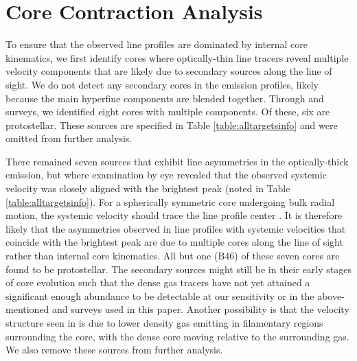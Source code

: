 \documentclass[iop,twocolappendix]{emulateapj}
\begin{document}
\section{Core Contraction Analysis}
\label{sec:analysis}

 To ensure that the observed {\HCO} line profiles are dominated by internal core kinematics, we first identify cores where optically-thin line tracers reveal multiple velocity components that are likely due to secondary sources along the line of sight. We do not detect any secondary cores in the {\NtD} emission profiles, likely because the main hyperfine components are blended together. Through {\NtH} \citep{Kirk2007} and {\ammonia} \citep{Rosolowsky2008} surveys, we identified eight cores with multiple components. Of these, six are protostellar. These sources are specified in Table \ref{table:alltargetsinfo} and were omitted from further analysis. 

There remained seven sources that exhibit line asymmetries in the optically-thick {\HCO} emission, but where examination by eye revealed that the observed systemic velocity was closely aligned with the brightest {\HCO} peak (noted in Table \ref{table:alltargetsinfo}). For a spherically symmetric core undergoing bulk radial motion, the systemic velocity should trace the line profile center \citep{DeVries2005}. It is therefore likely that the asymmetries observed in line profiles with systemic velocities that coincide with the brightest {\HCO} peak are due to multiple cores along the line of sight rather than internal core kinematics. All but one (B46) of these seven cores are found to be protostellar. The secondary sources might still be in their early stages of core evolution such that the dense gas tracers have not yet attained a significant enough abundance to be detectable at our sensitivity or in the above-mentioned {\NtD} and {\ammonia} surveys used in this paper. Another possibility is that the velocity structure seen in {\HCO} is due to lower density gas emitting in filamentary regions surrounding the core, with the dense core moving relative to the surrounding gas. We also remove these sources from further analysis. 

\end{document}
